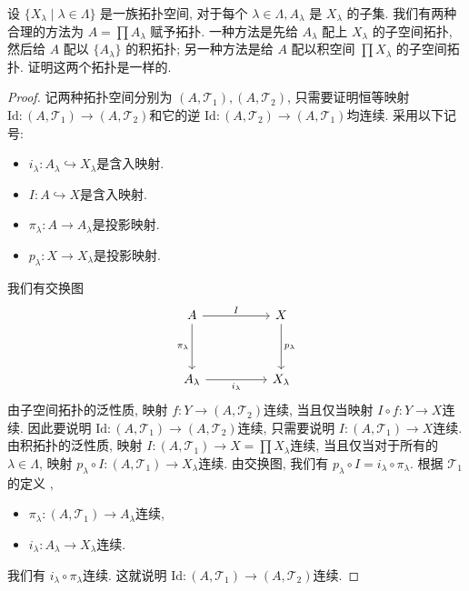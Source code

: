 \documentclass[../main.tex]{subfiles}
\begin{document}
\begin{exercise}{}{}
设 $\{X_\lambda \mid \lambda \in \Lambda\}$ 是一族拓扑空间, 对于每个 $\lambda \in \Lambda, A_\lambda$ 是 $X_\lambda$ 的子集. 我们有两种合理的方法为 $A = \prod A_\lambda$ 赋予拓扑. 一种方法是先给 $A_\lambda$ 配上 $X_\lambda$ 的子空间拓扑, 然后给 $A$ 配以 $\{A_\lambda\}$ 的积拓扑; 另一种方法是给 $A$ 配以积空间 $\prod X_\lambda$ 的子空间拓扑. 证明这两个拓扑是一样的.
\end{exercise}
\begin{proof}
记两种拓扑空间分别为 \(  \left( A,\mathcal{T}_{1} \right), \left( A,\mathcal{T}_{2} \right)    \), 只需要证明恒等映射 \(  \mathrm{Id}:\left( A,\mathcal{T}_{1} \right)\to \left( A,\mathcal{T}_{2} \right)    \)和它的逆 \(\mathrm{Id}:  \left( A, \mathcal{T}_{2} \right)\to \left( A,\mathcal{T}_{1} \right)    \)均连续.   
采用以下记号: \begin{itemize}
    \item \(  i_{ \lambda }:A_{ \lambda }\hookrightarrow X_{ \lambda }  \)是含入映射.
    \item \(  I:A\hookrightarrow X  \)是含入映射. 
    \item \(   \pi_{ \lambda }:A\to A_{ \lambda }  \)是投影映射.
    \item \(  p_{ \lambda }:X\to X_{ \lambda }  \)是投影映射.    
\end{itemize}
我们有交换图
\[\begin{tikzcd}
	A && X \\
	\\
	{A_\lambda} && {X_\lambda}
	\arrow["I", from=1-1, to=1-3]
	\arrow["{\pi_\lambda}"', from=1-1, to=3-1]
	\arrow["{p_\lambda}", from=1-3, to=3-3]
	\arrow["{i_\lambda}"', from=3-1, to=3-3]
\end{tikzcd}\]
由子空间拓扑的泛性质, 映射 \(  f:Y\to \left( A,\mathcal{T}_{2} \right)   \)连续, 当且仅当映射 \(  I\circ f: Y\to X  \)连续.  因此要说明 \(  \mathrm{Id} :\left( A,\mathcal{T}_{1} \right)\to \left( A,\mathcal{T}_{2} \right)    \)连续, 只需要说明 \(  I: \left( A,\mathcal{T}_{1} \right)\to X   \)连续.  由积拓扑的泛性质, 映射 \(  I:\left( A,\mathcal{T}_{1} \right)\to X= \prod X_{ \lambda }   \)连续, 当且仅当对于所有的 \(   \lambda \in  \Lambda   \), 映射 \(  p_{ \lambda }\circ I:\left( A,\mathcal{T}_{1} \right)\to X_{ \lambda }   \)连续.   由交换图, 我们有 \(  p_{ \lambda }\circ I= i_{ \lambda }\circ  \pi_{ \lambda }  \). 根据 \(  \mathcal{T}_{1}  \)的定义 ,  
\begin{itemize}
    \item \(   \pi_{ \lambda }:\left( A,\mathcal{T}_{1} \right)\to A_{ \lambda }   \)连续, 
    \item \(  i_{ \lambda }:A_{ \lambda }\to X_{ \lambda }  \)连续.  
\end{itemize}
我们有 \(  i_{ \lambda }\circ  \pi_{ \lambda }  \)连续.  这就说明 \(  \mathrm{Id}:\left( A,\mathcal{T}_{1} \right)\to \left( A,\mathcal{T}_{2} \right)    \)连续. 


\end{proof}
\end{document}
